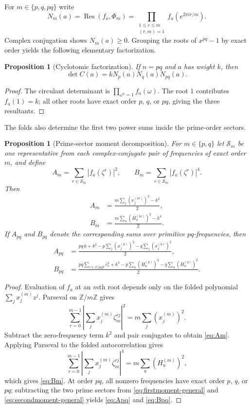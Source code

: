 \documentclass[11pt,a4paper]{article}
\newtheorem{proposition}[theorem]{Proposition}
\theoremstyle{definition}
\theoremstyle{remark}
\DeclareMathOperator{\Res}{Res}
\newcommand{\Z}{\mathbb Z}
\begin{document}
For $m\in\{p,q,pq\}$ write
\[
 N_m(a)=\Res(f_a,\Phi_m)
       =\prod_{\substack{1\le r\le m\\(r,m)=1}}
          f_a(e^{2\pi ir/m}).
\]
Complex conjugation shows $N_m(a)\ge0$.  Grouping the roots of
$x^{pq}-1$ by exact order yields the following elementary factorization.

\begin{proposition}[Cyclotomic factorization]
\label{prop:cyclo-factor}
If $n=pq$ and $a$ has weight $k$, then
\[
  \det C(a)=kN_p(a)N_q(a)N_{pq}(a).
\]
\end{proposition}

\begin{proof}
The circulant determinant is $\prod_{\omega^n=1}f_a(\omega)$.  The root
$1$ contributes $f_a(1)=k$; all other roots have exact order $p$, $q$, or
$pq$, giving the three resultants.
\end{proof}

The folds also determine the first two power sums inside the prime-order
sectors.

\begin{proposition}[Prime-sector moment decomposition]
\label{prop:sector-moments}
For $m\in\{p,q\}$ let $\mathcal S_m$ be one representative from each
complex-conjugate pair of frequencies of exact order $m$, and define
\[
 A_m=\sum_{r\in\mathcal S_m}|f_a(\zeta^r)|^2,
 \qquad
 B_m=\sum_{r\in\mathcal S_m}|f_a(\zeta^r)|^4.
\]
Then
\begin{align}
 A_m&=\frac{m\sum_j(x^{(m)}_j)^2-k^2}{2},
 \label{eq:Am}\\
 B_m&=\frac{m\sum_u(H^{(m)}_u)^2-k^4}{2}.
 \label{eq:Bm}
\end{align}
If $A_{pq}$ and $B_{pq}$ denote the corresponding sums over primitive
$pq$-frequencies, then
\begin{align}
 A_{pq}
   &=\frac{pq\,k+k^2-p\sum_j(x^{(p)}_j)^2
                    -q\sum_j(x^{(q)}_j)^2}{2},
 \label{eq:Apq}\\
 B_{pq}
   &=\frac{pq\sum_{s\in\Z/pq\Z}c_s^2+k^4
       -p\sum_u(H^{(p)}_u)^2-q\sum_u(H^{(q)}_u)^2}{2}.
 \label{eq:Bpq}
\end{align}
\end{proposition}

\begin{proof}
Evaluation of $f_a$ at an $m$th root depends only on the folded polynomial
$\sum_j x^{(m)}_jz^j$.  Parseval on $\Z/m\Z$ gives
\[
 \sum_{r=0}^{m-1}\left|\sum_jx^{(m)}_j\zeta_m^{rj}\right|^2
   =m\sum_j(x^{(m)}_j)^2.
\]
Subtract the zero-frequency term $k^2$ and pair conjugates to obtain
\eqref{eq:Am}.  Applying Parseval to the folded autocorrelation gives
\[
 \sum_{r=0}^{m-1}\left|\sum_jx^{(m)}_j\zeta_m^{rj}\right|^4
   =m\sum_u(H^{(m)}_u)^2,
\]
which gives \eqref{eq:Bm}.  At order $pq$, all nonzero frequencies have
exact order $p$, $q$, or $pq$; subtracting the two prime sectors from
\eqref{eq:firstmoment-general} and \eqref{eq:secondmoment-general} yields
\eqref{eq:Apq} and \eqref{eq:Bpq}.
\end{proof}
\end{document}
